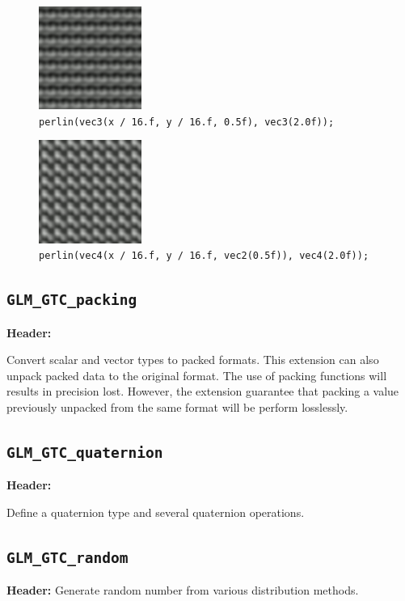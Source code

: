 \documentclass{scrartcl}
\numberwithin{figure}{subsection}
\begin{document}
\begin{figure}
  \centering
  \includegraphics[width=0.3\textwidth]{perlin5}
  \cprotect\caption{\verb|perlin(vec3(x / 16.f, y / 16.f, 0.5f), vec3(2.0f));|}
\end{figure}

\begin{figure}
  \centering
  \includegraphics[width=0.3\textwidth]{perlin6}
  \cprotect\caption{\verb|perlin(vec4(x / 16.f, y / 16.f, vec2(0.5f)), vec4(2.0f));|}
\end{figure}

\subsection{\texttt{GLM\_GTC\_packing}}
\textbf{Header:} 

Convert scalar and vector types to packed formats. This extension can also unpack packed data to the original format. The use of packing functions will results in precision lost. However, the extension guarantee that packing a value previously unpacked from the same format will be perform losslessly.

\subsection{\texttt{GLM\_GTC\_quaternion}}
\textbf{Header:} 

Define a quaternion type and several quaternion operations.

\subsection{\texttt{GLM\_GTC\_random}}
\textbf{Header:} 
Generate random number from various distribution methods.
\end{document}
